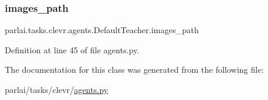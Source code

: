\subsubsection{\texorpdfstring{images\+\_\+path}{images\_path}}
{\footnotesize\ttfamily parlai.\+tasks.\+clevr.\+agents.\+Default\+Teacher.\+images\+\_\+path}



Definition at line 45 of file agents.\+py.



The documentation for this class was generated from the following file\+:\begin{DoxyCompactItemize}
\item 
parlai/tasks/clevr/\hyperlink{parlai_2tasks_2clevr_2agents_8py}{agents.\+py}\end{DoxyCompactItemize}
